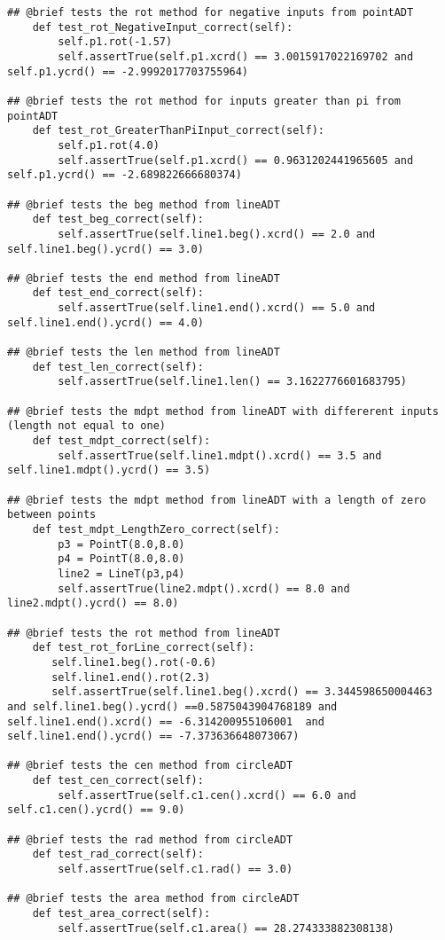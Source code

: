 \documentclass[12pt]{article}
\begin{document}
\begin{lstlisting}
## @brief tests the rot method for negative inputs from pointADT
    def test_rot_NegativeInput_correct(self):
        self.p1.rot(-1.57)
        self.assertTrue(self.p1.xcrd() == 3.0015917022169702 and self.p1.ycrd() == -2.9992017703755964)

## @brief tests the rot method for inputs greater than pi from pointADT
    def test_rot_GreaterThanPiInput_correct(self):
        self.p1.rot(4.0)
        self.assertTrue(self.p1.xcrd() == 0.9631202441965605 and self.p1.ycrd() == -2.689822666680374)

## @brief tests the beg method from lineADT
    def test_beg_correct(self):
        self.assertTrue(self.line1.beg().xcrd() == 2.0 and self.line1.beg().ycrd() == 3.0)

## @brief tests the end method from lineADT
    def test_end_correct(self):
        self.assertTrue(self.line1.end().xcrd() == 5.0 and self.line1.end().ycrd() == 4.0)

## @brief tests the len method from lineADT
    def test_len_correct(self):
        self.assertTrue(self.line1.len() == 3.1622776601683795)

## @brief tests the mdpt method from lineADT with differerent inputs (length not equal to one)
    def test_mdpt_correct(self):
        self.assertTrue(self.line1.mdpt().xcrd() == 3.5 and self.line1.mdpt().ycrd() == 3.5)

## @brief tests the mdpt method from lineADT with a length of zero between points
    def test_mdpt_LengthZero_correct(self):
        p3 = PointT(8.0,8.0)
        p4 = PointT(8.0,8.0)
        line2 = LineT(p3,p4)
        self.assertTrue(line2.mdpt().xcrd() == 8.0 and line2.mdpt().ycrd() == 8.0)

## @brief tests the rot method from lineADT
    def test_rot_forLine_correct(self):
       self.line1.beg().rot(-0.6)
       self.line1.end().rot(2.3)
       self.assertTrue(self.line1.beg().xcrd() == 3.344598650004463 and self.line1.beg().ycrd() ==0.5875043904768189 and self.line1.end().xcrd() == -6.314200955106001  and self.line1.end().ycrd() == -7.373636648073067)

## @brief tests the cen method from circleADT
    def test_cen_correct(self):
        self.assertTrue(self.c1.cen().xcrd() == 6.0 and self.c1.cen().ycrd() == 9.0)

## @brief tests the rad method from circleADT
    def test_rad_correct(self):
        self.assertTrue(self.c1.rad() == 3.0)
        
## @brief tests the area method from circleADT
    def test_area_correct(self):
        self.assertTrue(self.c1.area() == 28.274333882308138)


\end{lstlisting}
\end{document}
